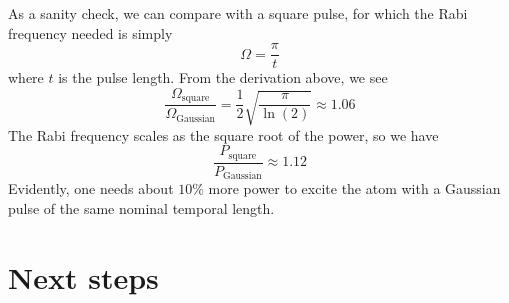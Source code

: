 As a sanity check, we can compare with a square pulse, for which the Rabi frequency needed is simply
\begin{equation}
    \Omega = \frac{\pi}{t}
\end{equation}
where $t$ is the pulse length. From the derivation above, we see \begin{equation}
    \frac{\Omega_{\textrm{square}}}{\Omega_{\textrm{Gaussian}}}=\frac{1}{2}\sqrt{\frac{\pi}{\ln(2)}} \approx 1.06
\end{equation}
The Rabi frequency scales as the square root of the power, so we have
\begin{equation}
\frac{P_{\textrm{square}}}{P_{\textrm{Gaussian}}} \approx 1.12
\end{equation}
Evidently, one needs about $10\%$ more power to excite the atom with a Gaussian pulse of the same nominal temporal length.

\section{Next steps}


